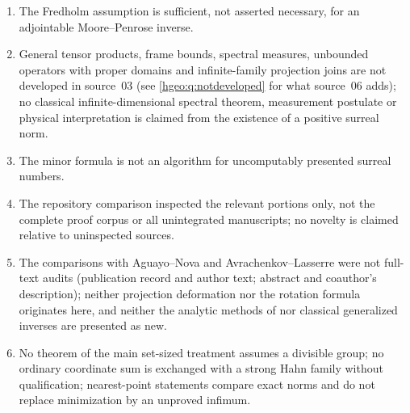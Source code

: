 \documentclass[11pt,letterpaper]{article}
\numberwithin{equation}{section}
\theoremstyle{definition}
\theoremstyle{remark}
\begin{document}
\begin{enumerate}[leftmargin=*,widest=00,label=03.\arabic*]
\item The Fredholm assumption is sufficient, not asserted necessary, for an
adjointable Moore--Penrose inverse.
\item General tensor products, frame bounds, spectral measures, unbounded
operators with proper domains and infinite-family projection joins are not
developed in source~03 (see \cref{hgeo:q:notdeveloped} for what source~06
adds); no classical infinite-dimensional spectral theorem, measurement
postulate or physical interpretation is claimed from the existence of a
positive surreal norm.
\item The minor formula is not an algorithm for uncomputably presented
surreal numbers.
\item The repository comparison inspected the relevant portions only, not
the complete proof corpus or all unintegrated manuscripts; no novelty is
claimed relative to uninspected sources.
\item The comparisons with Aguayo--Nova and Avrachenkov--Lasserre were not
full-text audits (publication record and author text; abstract and
coauthor's description); neither projection deformation nor the rotation
formula originates here, and neither the analytic methods of
\cite{Avrachenkov,MS} nor classical generalized inverses are presented as new.
\item No theorem of the main set-sized treatment assumes a divisible group;
no ordinary coordinate sum is exchanged with a strong Hahn family without
qualification; nearest-point statements compare exact norms and do not
replace minimization by an unproved infimum.
\end{enumerate}
\end{document}
